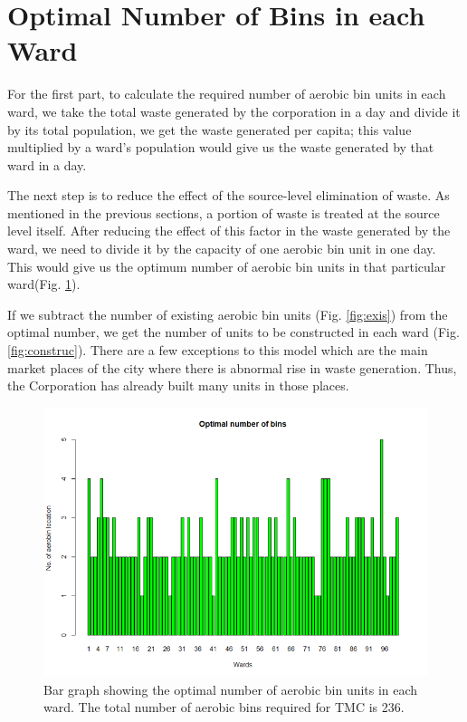 \documentclass[12pt,a4paper]{report}
\begin{document}
\newpage
\section{Optimal Number of Bins in each Ward}
For the first part, to calculate the required number of aerobic bin units in each ward, we take the total waste generated by the corporation in a day and divide it by its total population, we get the waste generated per capita; this value multiplied by a ward’s population would give us the waste generated by that ward in a day. 

The next step is to reduce the effect of the source-level elimination of waste. As mentioned in the previous sections, a portion of waste is treated at the source level itself. After reducing the effect of this factor in the waste generated by the ward, we need to divide it by the capacity of one aerobic bin unit in one day. This would give us the optimum number of aerobic bin units in that particular ward(Fig. \ref{fig:optimal}). 

If we subtract the number of existing aerobic bin units (Fig. \ref{fig:exis}) from the optimal number, we get the number of units to be constructed in each ward (Fig. \ref{fig:construc}). There are a few exceptions to this model which are the main market places of the city where there is abnormal rise in waste generation. Thus, the Corporation has already built many units in those places.

\begin{figure}[H]
	\centering
	\includegraphics[width=0.7\linewidth]{optimal}
	\caption{Bar graph showing the optimal number of aerobic bin units in each ward. The total number of aerobic bins required for TMC is 236.}
	\label{fig:optimal}
\end{figure}
	
\end{document}
